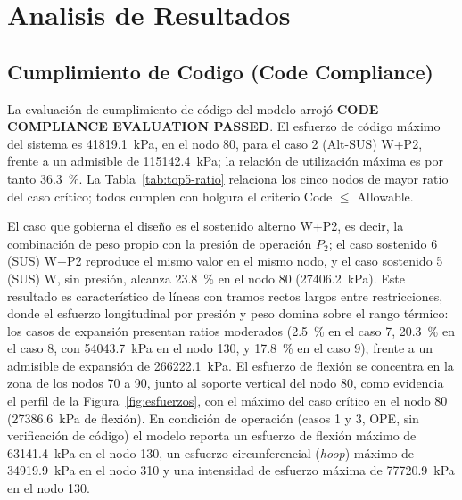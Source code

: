 \section{Analisis de Resultados}
\label{sec:analisis}

\subsection{Cumplimiento de Codigo (Code Compliance)}

La evaluaci\'{o}n de cumplimiento de c\'{o}digo del modelo arroj\'{o}
\textbf{CODE COMPLIANCE EVALUATION PASSED}. El esfuerzo de c\'{o}digo
m\'{a}ximo del sistema es \num{41819.1}~\si{kPa}, en el nodo 80, para el caso
2 (Alt-SUS) W+P2, frente a un admisible de \num{115142.4}~\si{kPa}; la
relaci\'{o}n de utilizaci\'{o}n m\'{a}xima es por tanto 36.3~\%. La
Tabla~\ref{tab:top5-ratio} relaciona los cinco nodos de mayor ratio del caso
cr\'{i}tico; todos cumplen con holgura el criterio Code $\leq$ Allowable.



El caso que gobierna el dise\~{n}o es el sostenido alterno W+P2, es decir, la
combinaci\'{o}n de peso propio con la presi\'{o}n de operaci\'{o}n $P_2$; el
caso sostenido 6 (SUS) W+P2 reproduce el mismo valor en el mismo nodo, y el
caso sostenido 5 (SUS) W, sin presi\'{o}n, alcanza 23.8~\% en el nodo 80
(\num{27406.2}~\si{kPa}). Este resultado es caracter\'{i}stico de l\'{i}neas
con tramos rectos largos entre restricciones, donde el esfuerzo longitudinal
por presi\'{o}n y peso domina sobre el rango t\'{e}rmico: los casos de
expansi\'{o}n presentan ratios moderados (2.5~\% en el caso 7, 20.3~\% en el
caso 8, con \num{54043.7}~\si{kPa} en el nodo 130, y 17.8~\% en el caso 9),
frente a un admisible de expansi\'{o}n de \num{266222.1}~\si{kPa}. El esfuerzo de flexi\'{o}n se concentra en la zona
de los nodos 70 a 90, junto al soporte vertical del nodo 80, como evidencia el
perfil de la Figura~\ref{fig:esfuerzos}, con el m\'{a}ximo del caso
cr\'{i}tico en el nodo 80 (\num{27386.6}~\si{kPa} de flexi\'{o}n). En
condici\'{o}n de operaci\'{o}n (casos 1 y 3, OPE, sin verificaci\'{o}n de
c\'{o}digo) el modelo reporta un esfuerzo de flexi\'{o}n m\'{a}ximo de
\num{63141.4}~\si{kPa} en el nodo 130, un esfuerzo circunferencial
(\textit{hoop}) m\'{a}ximo de \num{34919.9}~\si{kPa} en el nodo 310 y una
intensidad de esfuerzo m\'{a}xima de \num{77720.9}~\si{kPa} en el nodo 130.

